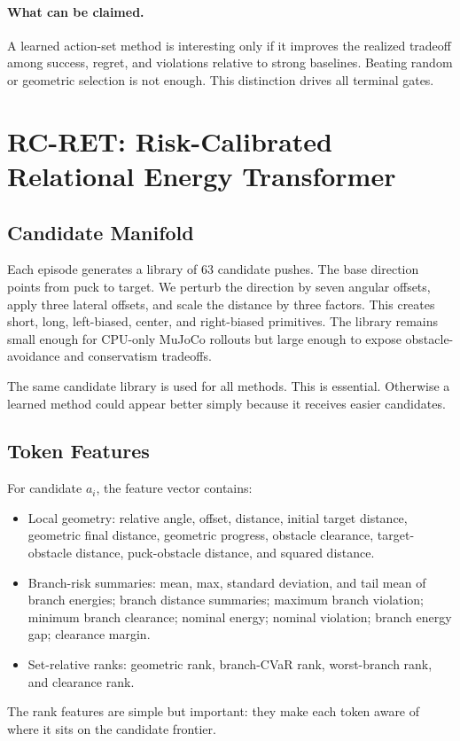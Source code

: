 \documentclass{article}
\newcommand{\method}{RC-RET}
\begin{document}
\paragraph{What can be claimed.}
A learned action-set method is interesting only if it improves the realized tradeoff among success, regret, and violations relative to strong baselines.  Beating random or geometric selection is not enough.  This distinction drives all terminal gates.

\section{\method: Risk-Calibrated Relational Energy Transformer}

\subsection{Candidate Manifold}

Each episode generates a library of 63 candidate pushes.  The base direction points from puck to target.  We perturb the direction by seven angular offsets, apply three lateral offsets, and scale the distance by three factors.  This creates short, long, left-biased, center, and right-biased primitives.  The library remains small enough for CPU-only MuJoCo rollouts but large enough to expose obstacle-avoidance and conservatism tradeoffs.

The same candidate library is used for all methods.  This is essential.  Otherwise a learned method could appear better simply because it receives easier candidates.

\subsection{Token Features}

For candidate $a_i$, the feature vector contains:
\begin{itemize}
\item Local geometry: relative angle, offset, distance, initial target distance, geometric final distance, geometric progress, obstacle clearance, target-obstacle distance, puck-obstacle distance, and squared distance.
\item Branch-risk summaries: mean, max, standard deviation, and tail mean of branch energies; branch distance summaries; maximum branch violation; minimum branch clearance; nominal energy; nominal violation; branch energy gap; clearance margin.
\item Set-relative ranks: geometric rank, branch-CVaR rank, worst-branch rank, and clearance rank.
\end{itemize}
The rank features are simple but important: they make each token aware of where it sits on the candidate frontier.
\end{document}
